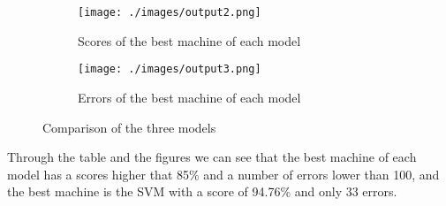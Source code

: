\documentclass{article}
\theoremstyle{mytheoremstyle}
\theoremstyle{mytheoremstyle}
\theoremstyle{myproblemstyle}
\begin{document}
\newpage

\begin{figure}[htbp]
  \centering
  \begin{subfigure}{0.45\textwidth}
    \centering
    \texttt{[image: ./images/output2.png]}
    \caption{Scores of the best machine of each model}
    \label{fig:Scores of the best machine of each model}
  \end{subfigure}
  \begin{subfigure}{0.45\textwidth}
    \centering
    \texttt{[image: ./images/output3.png]}
    \caption{Errors of the best machine of each model}
    \label{fig:Errors of the best machine of each model}
  \end{subfigure}
  \caption{Comparison of the three models}
  \label{fig:Comparison of the three models}
\end{figure}

Through the table and the figures we can see that the best machine of each model has a scores higher that 85\% and a number of errors lower than 100, and the best machine is the SVM with a score of 94.76\% and only 33 errors.
\end{document}

